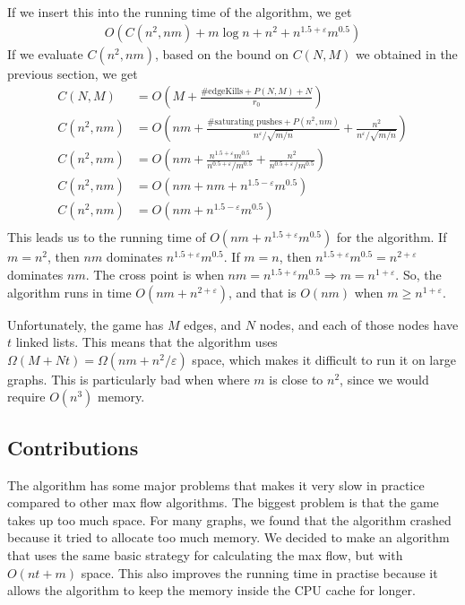 If we insert this into the running time of the algorithm, we get
\begin{align*}
O\left(C\left(n^2, nm\right) + m\log n + n^2 + n^{1.5+\varepsilon}m^{0.5}\right)
\end{align*}
If we evaluate $C(n^2, nm)$, based on the bound on $C(N, M)$ we obtained in the previous section, we get\\
\begin{align*}
C(N, M)&=O\left(M + \frac{\mathrm{\#edgeKills} + P(N, M) + N}{r_0}\right)\\
C(n^2, nm)&=O\left(nm + \frac{\text{\#saturating pushes} + P(n^2, nm)}{n^\varepsilon/\sqrt{m/n}} + \frac{n^2}{n^\varepsilon/\sqrt{m/n}}\right)\\
C(n^2, nm)&=O\left(nm + \frac{n^{1.5+\varepsilon}m^{0.5}}{n^{0.5 + \varepsilon}/m^{0.5}} + \frac{n^2}{n^{0.5 + \varepsilon}/m^{0.5}}\right)\\
C(n^2, nm)&=O\left(nm + nm + n^{1.5-\varepsilon}m^{0.5}\right)\\
C(n^2, nm)&=O\left(nm + n^{1.5-\varepsilon}m^{0.5}\right)\\
\end{align*}
This leads us to the running time of $O(nm + n^{1.5+\varepsilon}m^{0.5})$ for the algorithm. 
If $m = n^2$, then $nm$ dominates $n^{1.5+\varepsilon}m^{0.5}$.
If $m = n$, then $n^{1.5+\varepsilon}m^{0.5} = n^{2+\varepsilon}$ dominates $nm$.
The cross point is when $nm = n^{1.5+\varepsilon}m^{0.5} \Rightarrow m = n^{1+\varepsilon}$.
So, the algorithm runs in time $O(nm+n^{2+\varepsilon})$, and that is $O(nm)$ when $m \geq n^{1+\varepsilon}$.

Unfortunately, the game has $M$ edges, and $N$ nodes, and each of those nodes have $t$ linked lists.
This means that the algorithm uses $\Omega\left(M+Nt\right)=\Omega\left(nm+n^2/\varepsilon\right)$ space, 
which makes it difficult to run it on large graphs. This is particularly bad when where $m$ is close to $n^2$, since we would require $O(n^3)$ memory.


\subsection{Contributions}
\label{KRModificationsSection}

The \cite{King1992} algorithm has some major problems that makes it very slow in practice compared to other max flow algorithms.
The biggest problem is that the game takes up too much space. 
For many graphs, we found that the algorithm crashed because it tried to allocate too much memory.
We decided to make an algorithm that uses the same basic strategy for calculating the max flow, but with $O(nt+m)$ space.
This also improves the running time in practise because it allows the algorithm to keep the memory inside the CPU cache for longer.

